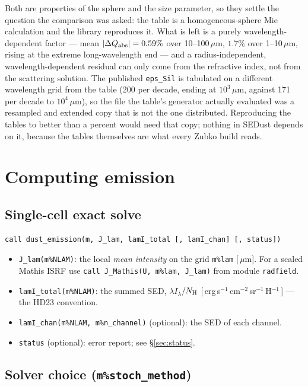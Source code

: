 \documentclass{my_memo}
\newcommand{\code}[1]{\texttt{#1}}
\newcommand{\lamIlam}{\ensuremath{\lambda I_\lambda}}
\newcommand{\Nh}{\ensuremath{N_{\rm H}}}
\newcommand{\um}{\ensuremath{\,\mu\mathrm{m}}}
\begin{document}
\noindent Both are properties of the sphere and the size parameter, so they
settle the question the comparison was asked: the table is a homogeneous-sphere
Mie calculation and the library reproduces it. What is left is a purely
wavelength-dependent factor --- mean $|\Delta Q_{\rm abs}| = 0.59\%$ over
10--100\um, $1.7\%$ over 1--10\um, rising at the extreme long-wavelength end
--- and a radius-independent, wavelength-dependent residual can only come from
the refractive index, not from the scattering solution. The published
\code{eps\_Sil} is tabulated on a different wavelength grid from the table
(200 per decade, ending at $10^3$\um, against 171 per decade to $10^4$\um), so
the file the table's generator actually evaluated was a resampled and extended
copy that is not the one distributed. Reproducing the tables to better than a
percent would need that copy; nothing in SEDust depends on it, because the
tables themselves are what every Zubko build reads.

\section{Computing emission}

\subsection{Single-cell exact solve}

\begin{lstlisting}
call dust_emission(m, J_lam, lamI_total [, lamI_chan] [, status])
\end{lstlisting}
\begin{itemize}
\item \code{J\_lam(m\%NLAM)}: the local \emph{mean intensity} on the grid
      \code{m\%lam} [\um]. For a scaled Mathis ISRF use
      \code{call J\_Mathis(U, m\%lam, J\_lam)} from module \code{radfield}.
\item \code{lamI\_total(m\%NLAM)}: the summed SED, \lamIlam$/\Nh$
      [\,erg\,s$^{-1}$\,cm$^{-2}$\,sr$^{-1}$\,H$^{-1}$\,] --- the HD23 convention.
\item \code{lamI\_chan(m\%NLAM, m\%n\_channel)} (optional): the SED of each channel.
\item \code{status} (optional): error report; see \S\ref{sec:status}.
\end{itemize}

\subsection{Solver choice (\code{m\%stoch\_method})}\label{sec:solver}
\end{document}
